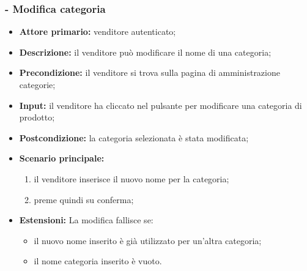 \subsubsection{- Modifica categoria}
\begin{itemize}
    \item \textbf{Attore primario:} venditore autenticato;
    \item \textbf{Descrizione:} il venditore può modificare il nome di una categoria;
    \item \textbf{Precondizione:} il venditore si trova sulla pagina di amministrazione categorie;
    \item \textbf{Input:} il venditore ha cliccato nel pulsante per modificare una categoria di prodotto;
    \item \textbf{Postcondizione:} la categoria selezionata è stata modificata;
    \item \textbf{Scenario principale:}
          \begin{enumerate}
              \item il venditore inserisce il nuovo nome per la categoria;
              \item preme quindi su conferma;
          \end{enumerate}
    \item \textbf{Estensioni:} La modifica fallisce se:
          \begin{itemize}
              \item il nuovo nome inserito è già utilizzato per un'altra categoria;
              \item il nome categoria inserito è vuoto.
          \end{itemize}
\end{itemize}

\stepsubUserCase
